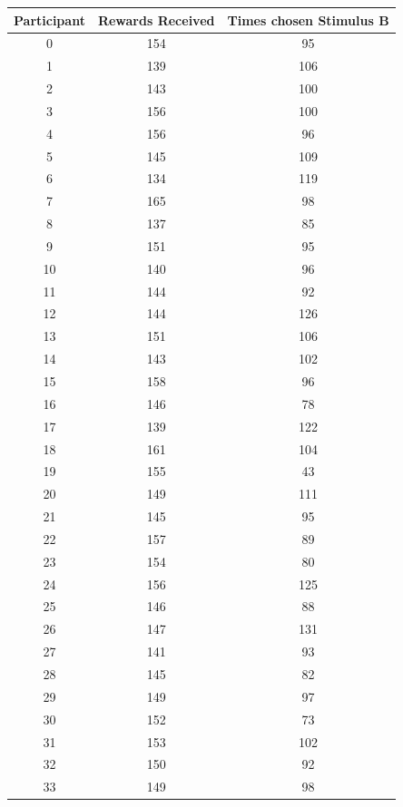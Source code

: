 \documentclass{article}
\begin{document}
\begin{appendices}
  
  \begin{table}
    \begin{tabular}{ccc}
      \toprule
      Participant &    Rewards Received &    Times chosen Stimulus B \\
      \midrule
      0  &  154 &   95 \\
      1  &  139 &  106 \\
      2  &  143 &  100 \\
      3  &  156 &  100 \\
      4  &  156 &   96 \\
      5  &  145 &  109 \\
      6  &  134 &  119 \\
      7  &  165 &   98 \\
      8  &  137 &   85 \\
      9  &  151 &   95 \\
      10 &  140 &   96 \\
      11 &  144 &   92 \\
      12 &  144 &  126 \\
      13 &  151 &  106 \\
      14 &  143 &  102 \\
      15 &  158 &   96 \\
      16 &  146 &   78 \\
      17 &  139 &  122 \\
      18 &  161 &  104 \\
      19 &  155 &   43 \\
      20 &  149 &  111 \\
      21 &  145 &   95 \\
      22 &  157 &   89 \\
      23 &  154 &   80 \\
      24 &  156 &  125 \\
      25 &  146 &   88 \\
      26 &  147 &  131 \\
      27 &  141 &   93 \\
      28 &  145 &   82 \\
      29 &  149 &   97 \\
      30 &  152 &   73 \\
      31 &  153 &  102 \\
      32 &  150 &   92 \\
      33 &  149 &   98 \\

\end{tabular}
\end{table}
\end{appendices}
\end{document}
